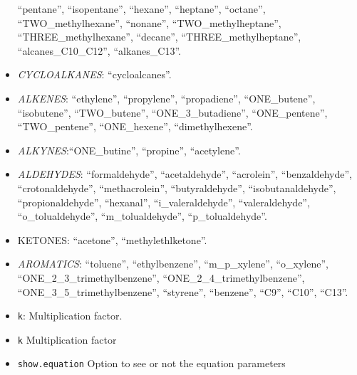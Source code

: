 \documentclass[12pt,graybox,envcountchap,sectrefs]{krantz}
\theoremstyle{definition}
\theoremstyle{definition}
\theoremstyle{definition}
\theoremstyle{remark}
\begin{document}
\begin{itemize}
  ``pentane'', ``isopentane'', ``hexane'', ``heptane'', ``octane'',
  ``TWO\_methylhexane'', ``nonane'', ``TWO\_methylheptane'',
  ``THREE\_methylhexane'', ``decane'', ``THREE\_methylheptane'',
  ``alcanes\_C10\_C12'', ``alkanes\_C13''.
\item
  \emph{CYCLOALKANES}: ``cycloalcanes''.
\item
  \emph{ALKENES}: ``ethylene'', ``propylene'', ``propadiene'',
  ``ONE\_butene'', ``isobutene'', ``TWO\_butene'',
  ``ONE\_3\_butadiene'', ``ONE\_pentene'', ``TWO\_pentene'',
  ``ONE\_hexene'', ``dimethylhexene''.
\item
  \emph{ALKYNES}:``ONE\_butine'', ``propine'', ``acetylene''.
\item
  \emph{ALDEHYDES}: ``formaldehyde'', ``acetaldehyde'', ``acrolein'',
  ``benzaldehyde'', ``crotonaldehyde'', ``methacrolein'',
  ``butyraldehyde'', ``isobutanaldehyde'', ``propionaldehyde'',
  ``hexanal'', ``i\_valeraldehyde'', ``valeraldehyde'',
  ``o\_tolualdehyde'', ``m\_tolualdehyde'', ``p\_tolualdehyde''.
\item
  KETONES: ``acetone'', ``methylethlketone''.
\item
  \emph{AROMATICS}: ``toluene'', ``ethylbenzene'', ``m\_p\_xylene'',
  ``o\_xylene'', ``ONE\_2\_3\_trimethylbenzene'',
  ``ONE\_2\_4\_trimethylbenzene'', ``ONE\_3\_5\_trimethylbenzene'',
  ``styrene'', ``benzene'', ``C9'', ``C10'', ``C13''.
\item
  \texttt{k}: Multiplication factor.
\item
  \texttt{k} Multiplication factor
\item
  \texttt{show.equation} Option to see or not the equation parameters
\end{itemize}
\end{document}
